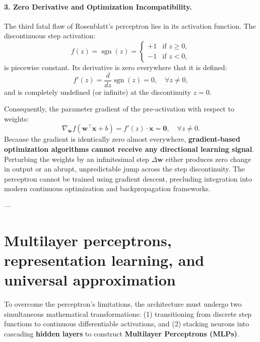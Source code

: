 \paragraph{3. Zero Derivative and Optimization Incompatibility.}
The third fatal flaw of Rosenblatt's perceptron lies in its activation function. The discontinuous step activation:
\begin{equation}
f(z) = \operatorname{sgn}(z) = \begin{cases} +1 & \text{if } z \ge 0, \\ -1 & \text{if } z < 0, \end{cases}
\end{equation}
is piecewise constant. Its derivative is zero everywhere that it is defined:
\begin{equation}
f'(z) = \frac{d}{dz}\operatorname{sgn}(z) = 0, \quad \forall z \ne 0,
\end{equation}
and is completely undefined (or infinite) at the discontinuity $z = 0$. 

Consequently, the parameter gradient of the pre-activation with respect to weights:
\begin{equation}
\nabla_\mathbf{w} f(\mathbf{w}^\top \mathbf{x} + b) = f'(z) \cdot \mathbf{x} = \mathbf{0}, \quad \forall z \ne 0.
\end{equation}
Because the gradient is identically zero almost everywhere, \textbf{gradient-based optimization algorithms cannot receive any directional learning signal}. Perturbing the weights by an infinitesimal step $\Delta \mathbf{w}$ either produces zero change in output or an abrupt, unpredictable jump across the step discontinuity. The perceptron cannot be trained using gradient descent, precluding integration into modern continuous optimization and backpropagation frameworks.

---

\section{Multilayer perceptrons, representation learning, and universal approximation}
\label{sec:mlp_and_representation_learning}

To overcome the perceptron's limitations, the architecture must undergo two simultaneous mathematical transformations: (1) transitioning from discrete step functions to continuous differentiable activations, and (2) stacking neurons into cascading \textbf{hidden layers} to construct \textbf{Multilayer Perceptrons (MLPs)}.

